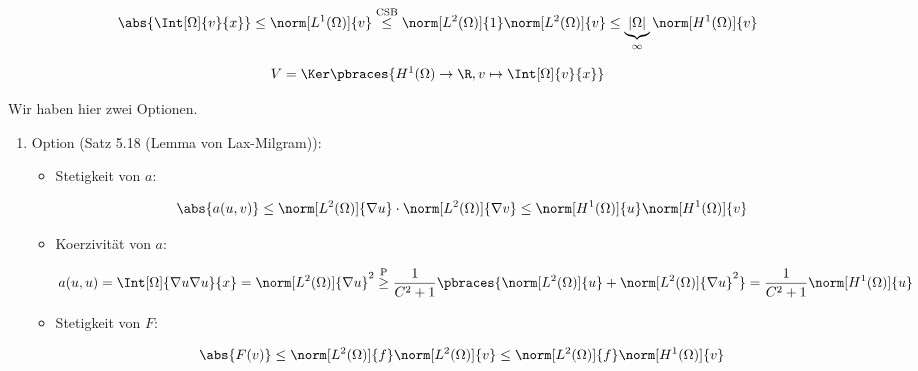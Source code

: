 \begin{solution}
\begin{enumerate}[label = \alph*)]
    \begin{align*}
        \abs{\Int[\Omega]{v}{x}}
        \leq
        \norm[L^1(\Omega)]{v}
        \stackrel
        {
            \mathrm{CSB}
        }{\leq}
        \norm[L^2(\Omega)]{1} \norm[L^2(\Omega)]{v}
        \leq
        \underbrace{|\Omega|}_\infty \norm[H^1(\Omega)]{v}
    \end{align*}

    \begin{align*}
        V = \Ker \pbraces{H^1(\Omega) \to \R, v \mapsto \Int[\Omega]{v}{x}}
    \end{align*}

    Wir haben hier zwei Optionen.

    \begin{enumerate}[label = \arabic*.]

        \item Option (Satz 5.18 (Lemma von Lax-Milgram)):

        \begin{itemize}

            \item Stetigkeit von $a$:

            \begin{align*}
                \abs{a(u, v)}
                \leq
                \norm[L^2(\Omega)]{\nabla u} \cdot \norm[L^2(\Omega)]{\nabla v}
                \leq
                \norm[H^1(\Omega)]{u} \norm[H^1(\Omega)]{v}
            \end{align*}

            \item Koerzivität von $a$:

            \begin{align*}
                a(u, u)
                =
                \Int[\Omega]{\nabla u \nabla u}{x}
                =
                \norm[L^2(\Omega)]{\nabla u}^2
                \stackrel
                {
                    \mathrm{P}
                }{\geq}
                \frac{1}{C^2 + 1}
                \pbraces
                {
                   \norm[L^2(\Omega)]{u} + \norm[L^2(\Omega)]{\nabla u}^2
                }
                =
                \frac{1}{C^2 + 1} \norm[H^1(\Omega)]{u}
            \end{align*}

            \item Stetigkeit von $F$:

            \begin{align*}
                \abs{F(v)}
                \leq
                \norm[L^2(\Omega)]{f} \norm[L^2(\Omega)]{v}
                \leq
                \norm[L^2(\Omega)]{f} \norm[H^1(\Omega)]{v}
            \end{align*}


\end{itemize}
\end{enumerate}
\end{enumerate}
\end{solution}

